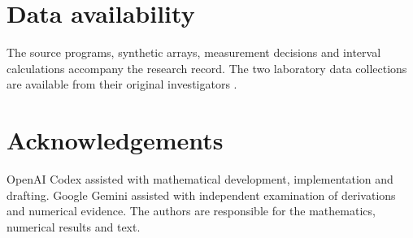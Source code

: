 \section*{Data availability}
The source programs, synthetic arrays, measurement decisions and interval calculations accompany the research record. The two laboratory data collections are available from their original investigators \cite{fresnel,manitoba}. 
\section*{Acknowledgements}
OpenAI Codex assisted with mathematical development, implementation and drafting. Google Gemini assisted with independent examination of derivations and numerical evidence. The authors are responsible for the mathematics, numerical results and text.
